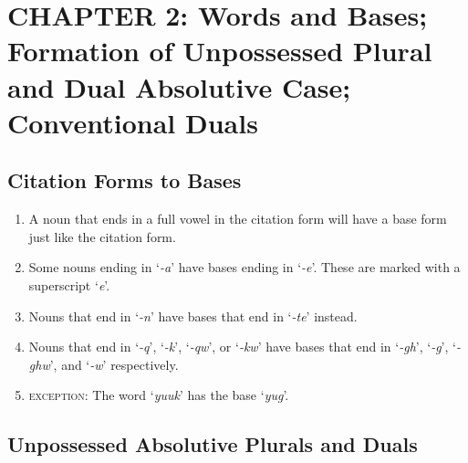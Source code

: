 \documentclass{article}
\begin{document}
\section{}

\section{CHAPTER 2: Words and Bases; Formation of Unpossessed Plural and Dual
Absolutive Case; Conventional Duals}

\subsection{Citation Forms to Bases}

\begin{enumerate}
\item A noun that ends in a full vowel in the citation form will have a base form just like the citation form.
\item Some nouns ending in `\textit{-a}' have bases ending in `\textit{-e}'. These are marked with a superscript `\textit{e}'.
\item Nouns that end in `\textit{-n}' have bases that end in `\textit{-te}' instead.
\item Nouns that end in `\textit{-q}', `\textit{-k}', `\textit{-qw}', or `\textit{-kw}' have bases that end in `\textit{-gh}', `\textit{-g}', `\textit{-ghw}', and `\textit{-w}' respectively.
\item \textsc{exception}: The word `\textit{yuuk}' has the base `\textit{yug}'.
\end{enumerate}

\subsection{Unpossessed Absolutive Plurals and Duals}
\end{document}
